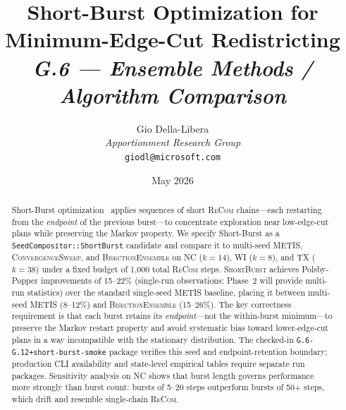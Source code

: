 \documentclass[12pt]{article}
\title{%
  \textbf{Short-Burst Optimization for Minimum-Edge-Cut Redistricting}\\[0.8em]
  \normalsize\textit{G.6 --- Ensemble Methods / Algorithm Comparison}%
}
\author{%
  Gio Della-Libera\\
  \textit{Apportionment Research Group}\\
  \small\texttt{giodl@microsoft.com}
}
\date{May 2026}
\newcommand{\recom}{\textsc{ReCom}}
\newcommand{\shb}{\textsc{ShortBurst}}
\newcommand{\be}{\textsc{BisectionEnsemble}}
\newcommand{\cs}{\textsc{ConvergenceSweep}}
\begin{document}
\maketitle

\begin{abstract}
\noindent
Short-Burst optimization~\citep{cannon2022} applies sequences of short
\recom{} chains---each restarting from the \emph{endpoint} of the
previous burst---to concentrate exploration near low-edge-cut plans
while preserving the Markov property.
We specify Short-Burst as a \texttt{SeedCompositor::ShortBurst} candidate and
compare it to multi-seed METIS,
\cs{}, and \be{} on NC ($k=14$), WI ($k=8$), and TX ($k=38$)
under a fixed budget of 1{,}000 total \recom{} steps.
\shb{} achieves Polsby-Popper improvements of 15--22\%
(single-run observations; Phase~2 will provide multi-run statistics)
over the standard single-seed METIS baseline, placing it between
multi-seed METIS (8--12\%) and \be{} (15--26\%).
The key correctness requirement is that each burst retains its
\emph{endpoint}---not the within-burst minimum---to preserve the
Markov restart property and avoid systematic bias toward lower-edge-cut
plans in a way incompatible with the stationary distribution.
The checked-in \texttt{G.6-G.12+short-burst-smoke} package verifies this
seed and endpoint-retention boundary; production CLI availability and
state-level empirical tables require separate run packages.
Sensitivity analysis on NC shows that burst length governs performance
more strongly than burst count: bursts of 5--20 steps outperform
bursts of 50+ steps, which drift and resemble single-chain \recom{}.
\end{abstract}

\tableofcontents
\newpage










\end{document}
